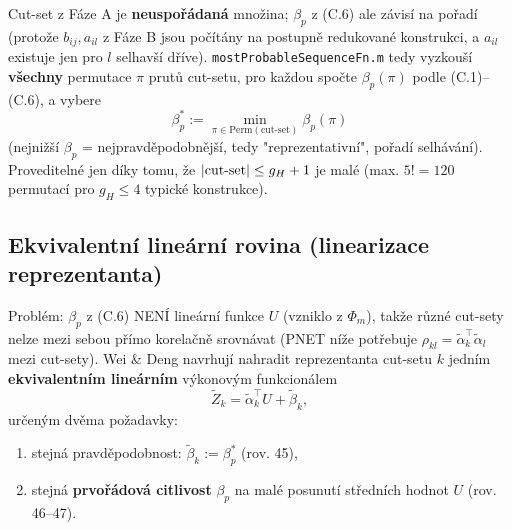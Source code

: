\documentclass[11pt,a4paper]{article}
\newcommand{\code}[1]{\texttt{#1}}
\begin{document}
Cut-set z Fáze A je \textbf{neuspořádaná} množina; $\beta_p$ z (C.6) ale závisí na pořadí (protože
$b_{ij},a_{il}$ z Fáze B jsou počítány na postupně redukované konstrukci, a $a_{il}$ existuje jen
pro $l$ selhavší dříve). \code{mostProbableSequenceFn.m} tedy vyzkouší \textbf{všechny} permutace
$\pi$ prutů cut-setu, pro každou spočte $\beta_p(\pi)$ podle (C.1)--(C.6), a vybere
\[
  \beta_p^{\ast} := \min_{\pi\in\mathrm{Perm}(\text{cut-set})} \beta_p(\pi)
\]
(nejnižší $\beta_p$ = nejpravděpodobnější, tedy "reprezentativní", pořadí selhávání). Proveditelné jen
díky tomu, že $|{\rm cut\text{-}set}|\le g_H+1$ je malé (max. $5!=120$ permutací pro $g_H\le4$ typické
konstrukce).

\subsection{Ekvivalentní lineární rovina (linearizace reprezentanta)}
\label{sec:c4}

Problém: $\beta_p$ z (C.6) NENÍ lineární funkce $U$ (vzniklo z $\Phi_m$), takže různé cut-sety
nelze mezi sebou přímo korelačně srovnávat (PNET níže potřebuje $\rho_{kl}=\tilde\alpha_k^\top
\tilde\alpha_l$ mezi cut-sety). Wei \& Deng navrhují nahradit reprezentanta cut-setu $k$ jedním
\textbf{ekvivalentním lineárním} výkonovým funkcionálem
\[
  \tilde Z_k = \tilde\alpha_k^\top U + \tilde\beta_k,
\]
určeným dvěma požadavky:
\begin{enumerate}
  \item stejná pravděpodobnost: $\tilde\beta_k := \beta_p^\ast$ (rov. 45),
  \item stejná \textbf{prvořádová citlivost} $\beta_p$ na malé posunutí středních hodnot $U$
        (rov. 46--47).
\end{enumerate}
\end{document}
